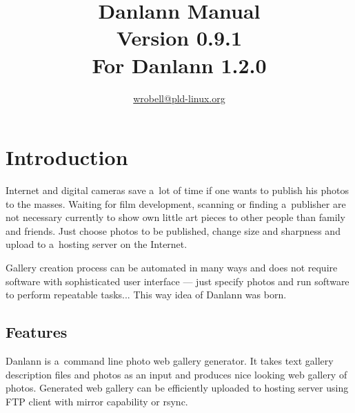 \documentclass{article}
\title{Danlann Manual\\\small{Version 0.9.1\\For Danlann 1.2.0}}
\author{\url{wrobell@pld-linux.org}}
\begin{document}
\maketitle

\tableofcontents
{}

\section{Introduction}
Internet and digital cameras save a~lot of time
if one wants to publish his photos to the masses. Waiting for film
development, scanning or finding a~publisher are not necessary currently to show
own little art pieces to other people than family and friends. Just choose
photos to be published, change size and sharpness and
upload to a~hosting server on the Internet.

Gallery creation process can be automated in many ways and does not require
software with sophisticated user interface --- just specify photos and run
software to perform repeatable tasks... This way idea of Danlann was born.

\subsection{Features}
Danlann is a~command line photo web gallery generator.
It takes text gallery description files and photos as an input and produces 
nice looking web gallery of photos. Generated web gallery can be
efficiently uploaded to hosting server using FTP client with
mirror capability or rsync.
\end{document}
